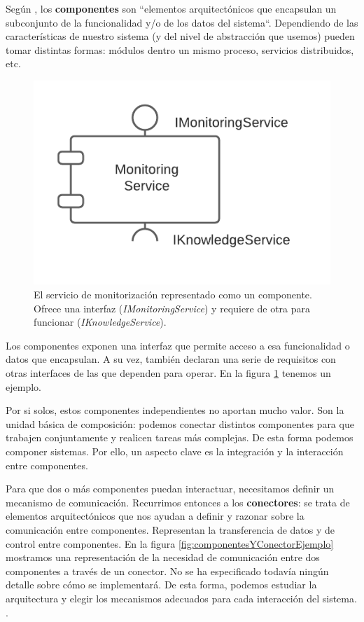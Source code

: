 Según \cite{taylorSoftwareArchitectureFoundations2009}, los \textbf{componentes} son ``elementos arquitectónicos que encapsulan un subconjunto de la funcionalidad y/o de los datos del sistema``.
Dependiendo de las características de nuestro sistema (y del nivel de abstracción que usemos) pueden tomar distintas formas: módulos dentro un mismo proceso, servicios distribuidos, etc.

\begin{figure}
  \centering
  \includegraphics[scale=0.8]{02_arquitectura/images/componente-ejemplo}
  \caption{El servicio de monitorización representado como un componente. Ofrece una interfaz (\textit{IMonitoringService}) y requiere de otra para funcionar (\textit{IKnowledgeService}).}
  \label{fig:componenteEjemplo}
\end{figure}

Los componentes exponen una interfaz que permite acceso a esa funcionalidad o datos que encapsulan. A su vez, también declaran una serie de requisitos con otras interfaces de las que dependen para operar. En la figura \ref{fig:componenteEjemplo} tenemos un ejemplo.

Por si solos, estos componentes independientes no aportan mucho valor. Son la unidad básica de composición: podemos conectar distintos componentes para que trabajen conjuntamente y realicen tareas más complejas. De esta forma podemos componer sistemas. Por ello, un aspecto clave es la integración y la interacción entre componentes. \cite{mehtaTaxonomySoftwareConnectors2000}

Para que dos o más componentes puedan interactuar, necesitamos definir un mecanismo de comunicación. Recurrimos entonces a los \textbf{conectores}: se trata de elementos arquitectónicos que nos ayudan a definir y razonar sobre la comunicación entre componentes. Representan la transferencia de datos y de control entre componentes. En la figura \ref{fig:componentesYConectorEjemplo} mostramos una representación de la necesidad de comunicación entre dos componentes a través de un conector. No se ha especificado todavía ningún detalle sobre cómo se implementará. De esta forma, podemos estudiar la arquitectura y elegir los mecanismos adecuados para cada interacción del sistema. \cite{taylorSoftwareArchitectureFoundations2009}.

